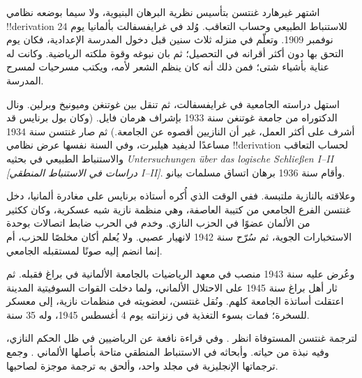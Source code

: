 \documentclass[../../../include/open-logic-section]{subfiles}
\begin{document}



اشتهر غيرهارد غنتسن بتأسيس نظرية البرهان البنيوية، ولا سيما بوضعه نظامي
!!{derivation} للاستنباط الطبيعي وحساب التعاقب. وُلد في غرايفسفالت
بألمانيا يوم 24 نوفمبر 1909. وتعلّم في منزله ثلاث سنين قبل دخول المدرسة
الإعدادية، فكان يوم التحق بها دون أكثر أقرانه في التحصيل؛ ثم بان نبوغه
وقوة ملكته الرياضية. وكانت له عناية بأشياء شتى؛ فمن ذلك أنه كان ينظم
الشعر لأمه، ويكتب مسرحيات لمسرح المدرسة.

استهل دراسته الجامعية في غرايفسفالت، ثم تنقل بين غوتنغن وميونيخ
وبرلين. ونال الدكتوراه من جامعة غوتنغن سنة 1933 بإشراف هرمان فايل.
(وكان بول برنايس قد أشرف على أكثر العمل، غير أن النازيين أقصوه عن
الجامعة.) ثم صار غنتسن سنة 1934 مساعدًا لديفيد هيلبرت، وفي السنة نفسها
عرض نظامي !!{derivation} لحساب التعاقب والاستنباط الطبيعي في بحثيه
\emph{Untersuchungen \"{u}ber das logische Schlie\ss en I--II
  [دراسات في الاستنباط المنطقي I--II]}. وأقام سنة 1936 برهان اتساق
مسلمات بيانو.

وعلاقته بالنازية ملتبسة. ففي الوقت الذي أُكره أستاذه برنايس على مغادرة
ألمانيا، دخل غنتسن الفرع الجامعي من كتيبة العاصفة، وهي منظمة نازية شبه
عسكرية، وكان ككثير من الألمان عضوًا في الحزب النازي. وخدم في الحرب ضابط
اتصالات بوحدة الاستخبارات الجوية، ثم سُرّح سنة 1942 لانهيار عصبي. ولا
يُعلم أكان مخلصًا للحزب، أم إنما انضم إليه صونًا لمستقبله الجامعي.

وعُرض عليه سنة 1943 منصب في معهد الرياضيات بالجامعة الألمانية في براغ
فقبله. ثم ثار أهل براغ سنة 1945 على الاحتلال الألماني، ولما دخلت القوات
السوفيتية المدينة اعتقلت أساتذة الجامعة كلهم. ونُقل غنتسن، لعضويته في
منظمات نازية، إلى معسكر للسخرة؛ فمات بسوء التغذية في زنزانته يوم 4
أغسطس 1945، وله 35 سنة.

\begin{reading}
لترجمة غنتسن المستوفاة انظر \citet{Menzler-Trott2007}. وفي
\citet{Segal2014} قراءة نافعة عن الرياضيين في ظل الحكم النازي، وفيه
نبذة من حياته. وأبحاثه في الاستنباط المنطقي متاحة بأصلها الألماني
\citep{Gentzen1935a,Gentzen1935b}. وجمع \citet{Gentzen1969} ترجماتها
الإنجليزية في مجلد واحد، وألحق به ترجمة موجزة لصاحبها.
\end{reading}
\end{document}
